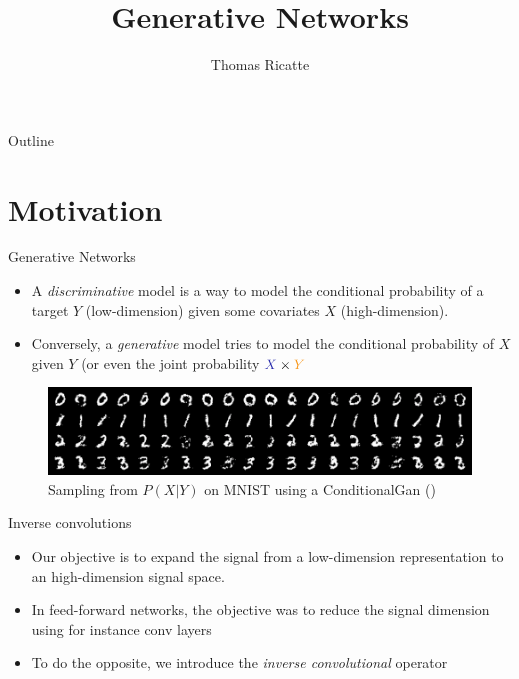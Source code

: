\documentclass{beamer}
\title{Generative Networks}
\author{Thomas Ricatte}
\begin{document}
\begin{frame} 	 
\titlepage
\end{frame}

\begin{frame}[fragile]{Outline}
  \tableofcontents
\end{frame}

\section{Motivation}

\begin{frame}{Generative Networks}

\begin{itemize}
    \item A \emph{discriminative} model is a way to model the conditional probability of a target \textcolor{cOrange}{$Y$ (low-dimension)} given some covariates \textcolor{cBlue}{$X$ (high-dimension)}.
    \item Conversely, a \emph{generative} model tries to model the conditional probability of \textcolor{cBlue}{$X$} given \textcolor{cOrange}{$Y$} (or even the joint probability $\textcolor{cBlue}{X} \times \textcolor{cOrange}{Y}$
\end{itemize}
\begin{figure}
    \centering
    \includegraphics[width=0.7\linewidth]{images/conditional_mnist.png}
    \caption{Sampling from $P(X|Y)$ on MNIST using a ConditionalGan (\cite{cgan})}
\end{figure}
\end{frame}

\begin{frame}{Inverse convolutions}
    \begin{itemize}
    \item Our objective is to expand the signal from a \textcolor{cOrange}{low-dimension} representation to an \textcolor{cBlue}{high-dimension} signal space.
    \item In feed-forward networks, the objective was to reduce the signal dimension using for instance conv layers
    \end{itemize}
    \begin{figure}
        \centering
    \end{figure}
    \begin{itemize}
        \item To do the opposite, we introduce the \emph{inverse convolutional} operator
    \end{itemize}
\end{frame}
\end{document}
